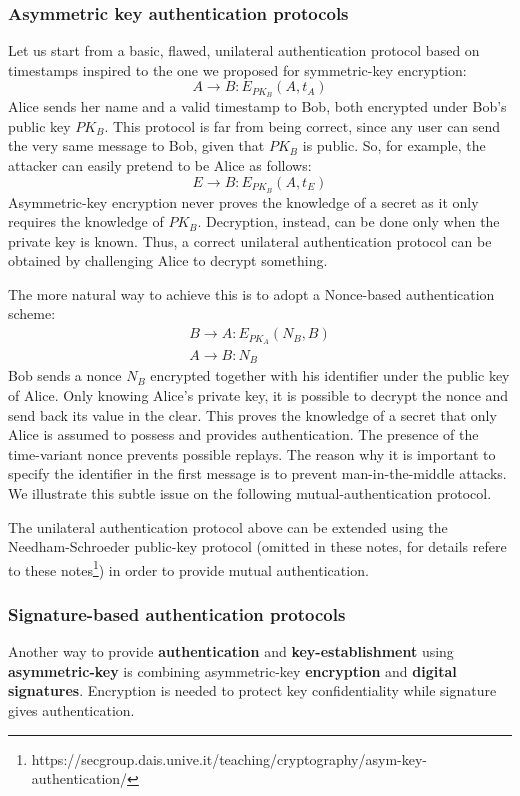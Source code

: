 \subsubsection{Asymmetric key authentication protocols}
Let us start from a basic, flawed, unilateral authentication protocol based on timestamps inspired to the one we proposed for symmetric-key encryption:
$$A \rightarrow B: E_{PK_B}(A, t_A) $$
Alice sends her name and a valid timestamp to Bob, both encrypted under Bob’s public key $PK_B$. This protocol is far from being correct, since any user can send the very same message to Bob, given that $PK_B$ is public. So, for example, the attacker can easily pretend to be Alice as follows:
$$E \rightarrow B: E_{PK_B}(A, t_E)$$ 
Asymmetric-key encryption never proves the knowledge of a secret as it only requires the knowledge of $PK_B$. Decryption, instead, can be done only when the private key is known. Thus, a correct unilateral authentication protocol can be obtained by challenging Alice to decrypt something. 

The more natural way to achieve this is to adopt a Nonce-based authentication scheme:
$$\begin{array}{l} B\rightarrow A: E_{PK_A}(N_B,B) \\ A\rightarrow B: N_B \end{array}$$
Bob sends a nonce $N_B$ encrypted together with his identifier under the public key of Alice. Only knowing Alice’s private key, it is possible to decrypt the nonce and send back its value in the clear. This proves the knowledge of a secret that only Alice is assumed to possess and provides authentication. The presence of the time-variant nonce prevents possible replays. The reason why it is important to specify the identifier in the first message is to prevent man-in-the-middle attacks. We illustrate this subtle issue on the following mutual-authentication protocol.

The unilateral authentication protocol above can be extended using the Needham-Schroeder public-key protocol (omitted in these notes, for details refere to these notes\footnote{https://secgroup.dais.unive.it/teaching/cryptography/asym-key-authentication/}) in order to provide mutual authentication.

\subsubsection{Signature-based authentication protocols}
Another way to provide \textbf{authentication} and \textbf{key-establishment} using \textbf{asymmetric-key} is combining asymmetric-key \textbf{encryption} and \textbf{digital signatures}. Encryption is needed to protect key confidentiality while signature gives authentication. 

